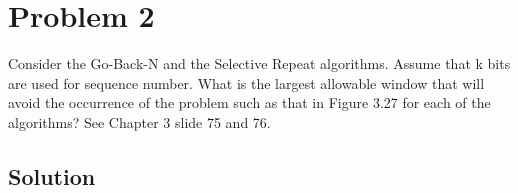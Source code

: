 
\section*{Problem 2}

Consider the Go-Back-N and the Selective Repeat algorithms.
Assume that k bits are used for sequence number.
What is the largest allowable window that will avoid the occurrence of the problem such as that in Figure 3.27 for each of the algorithms?
See Chapter 3 slide 75 and 76.

\subsection*{Solution}
